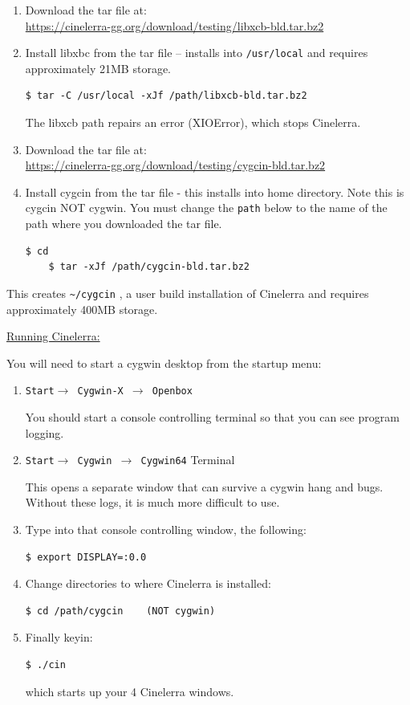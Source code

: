 \begin{enumerate}
	\item Download the tar file at:\\
	 {\small \url{https://cinelerra-gg.org/download/testing/libxcb-bld.tar.bz2}}
	\item Install libxbc from the tar file -- installs into \texttt{/usr/local} and requires approximately 21MB storage.
\begin{lstlisting}[numbers=none]
	$ tar -C /usr/local -xJf /path/libxcb-bld.tar.bz2
\end{lstlisting}
The libxcb path repairs an error (XIOError), which stops Cinelerra.
	\item Download the tar file at:\\
	{\small \url{https://cinelerra-gg.org/download/testing/cygcin-bld.tar.bz2}}	
	\item Install cygcin from the tar file - this installs into home directory.  Note this is cygcin NOT cygwin. You must change the \texttt{path} below to the name of the path where you downloaded the tar file.
\begin{lstlisting}[numbers=none]
	$ cd
	$ tar -xJf /path/cygcin-bld.tar.bz2
\end{lstlisting}
\end{enumerate}
This creates \texttt{\~{}/cygcin} , a user build installation of Cinelerra and requires approximately 400MB storage.

\underline{Running Cinelerra:}

You will need to start a cygwin desktop from the startup menu:
\begin{enumerate}
	\item \texttt{Start$\rightarrow$ Cygwin-X $\rightarrow$ Openbox}

You should start a console controlling terminal so that you can see program logging.
	\item \texttt{Start$\rightarrow$ Cygwin $\rightarrow$ Cygwin64} Terminal

This opens a separate window that can survive a cygwin hang and bugs. Without these logs, it is much more difficult to use.

	\item Type into that console controlling window, the following:
\begin{lstlisting}[language=bash,numbers=none]
	$ export DISPLAY=:0.0
\end{lstlisting}
	\item Change directories to where Cinelerra is installed:
\begin{lstlisting}[numbers=none]
	$ cd /path/cygcin    (NOT cygwin)
\end{lstlisting}
	\item Finally keyin:
\begin{lstlisting}[numbers=none]
	$ ./cin
\end{lstlisting}
which starts up your 4 Cinelerra windows.
\end{enumerate}

